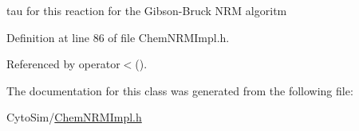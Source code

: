 tau for this reaction for the Gibson-\/\-Bruck N\-R\-M algoritm 



Definition at line 86 of file Chem\-N\-R\-M\-Impl.\-h.



Referenced by operator$<$().



The documentation for this class was generated from the following file\-:\begin{DoxyCompactItemize}
\item 
Cyto\-Sim/\hyperlink{ChemNRMImpl_8h}{Chem\-N\-R\-M\-Impl.\-h}\end{DoxyCompactItemize}
